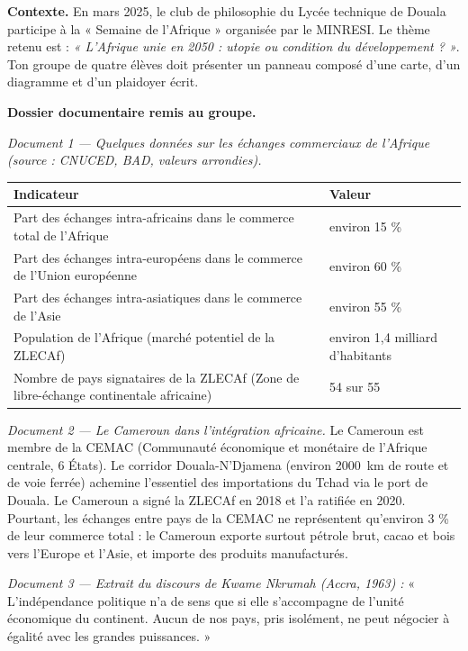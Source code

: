 \documentclass[11pt]{article}
\newcounter{popsec}
\newcounter{popsub}
\newcommand{\courssub}[1]{%
  \stepcounter{popsub}%
  \par\vspace{9pt}\noindent{\popxbold\fontsize{11.5}{13}\selectfont\color{popink}{\color{poporange}\thepopsec.\thepopsub}\hspace{6pt}#1}\par\nopagebreak\vspace{4pt}
}
\begin{document}
\courssub{Situation}

\textbf{Contexte.} En mars 2025, le club de philosophie du Lycée technique de Douala participe à la « Semaine de l'Afrique » organisée par le MINRESI. Le thème retenu est : \emph{« L'Afrique unie en 2050 : utopie ou condition du développement ? »}. Ton groupe de quatre élèves doit présenter un panneau composé d'une carte, d'un diagramme et d'un plaidoyer écrit.

\textbf{Dossier documentaire remis au groupe.}

\emph{Document 1 — Quelques données sur les échanges commerciaux de l'Afrique (source : CNUCED, BAD, valeurs arrondies).}
\begin{center}
\begin{tabularx}{\linewidth}{|l|X|}\hline
\rowcolor{popblueL} \textbf{Indicateur} & \textbf{Valeur} \\ \hline
Part des échanges intra-africains dans le commerce total de l'Afrique & environ 15 \% \\ \hline
Part des échanges intra-européens dans le commerce de l'Union européenne & environ 60 \% \\ \hline
Part des échanges intra-asiatiques dans le commerce de l'Asie & environ 55 \% \\ \hline
Population de l'Afrique (marché potentiel de la ZLECAf) & environ 1,4 milliard d'habitants \\ \hline
Nombre de pays signataires de la ZLECAf (Zone de libre-échange continentale africaine) & 54 sur 55 \\ \hline
\end{tabularx}
\end{center}

\emph{Document 2 — Le Cameroun dans l'intégration africaine.} Le Cameroun est membre de la CEMAC (Communauté économique et monétaire de l'Afrique centrale, 6 États). Le corridor Douala-N'Djamena (environ \SI{2000}{km} de route et de voie ferrée) achemine l'essentiel des importations du Tchad via le port de Douala. Le Cameroun a signé la ZLECAf en 2018 et l'a ratifiée en 2020. Pourtant, les échanges entre pays de la CEMAC ne représentent qu'environ 3 \% de leur commerce total : le Cameroun exporte surtout pétrole brut, cacao et bois vers l'Europe et l'Asie, et importe des produits manufacturés.

\emph{Document 3 — Extrait du discours de Kwame Nkrumah (Accra, 1963) :} « L'indépendance politique n'a de sens que si elle s'accompagne de l'unité économique du continent. Aucun de nos pays, pris isolément, ne peut négocier à égalité avec les grandes puissances. »
\end{document}
